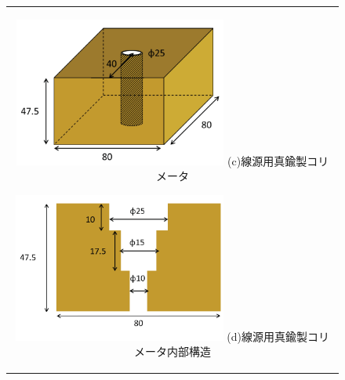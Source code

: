 \begin{figure}[H]
	\centering
		\begin{tabular}{c}
			\begin{minipage}[t]{0.5\hsize}
				\centering
					\includegraphics[width=70mm]{fig/isb/collimator3.png}
					\hspace{1.6cm} (c)線源用真鍮製コリメータ
			\end{minipage}
			\begin{minipage}[t]{0.5\hsize}
				\centering
					\includegraphics[width=70mm]{fig/isb/collimator4.png}
					\hspace{1.6cm} (d)線源用真鍮製コリメータ内部構造
			\end{minipage}
		\end{tabular}
	\end{figure}
